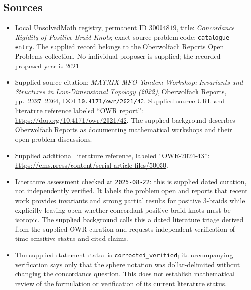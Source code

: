 \documentclass[11pt]{article}
\begin{document}
\subsection{Sources}
\begin{itemize}
\item Local UnsolvedMath registry, permanent ID \(30004819\), title: \emph{Concordance Rigidity of Positive Braid Knots}; exact source problem code: \texttt{catalogue entry}. The supplied record belongs to the Oberwolfach Reports Open Problems collection. No individual proposer is supplied; the recorded proposed year is \(2021\).
\item Supplied source citation: \emph{MATRIX-MFO Tandem Workshop: Invariants and Structures in Low-Dimensional Topology (2022)}, Oberwolfach Reports, pp.\ 2327--2364, DOI \texttt{10.4171/owr/2021/42}. Supplied source URL and literature reference labeled ``OWR report'': \url{https://doi.org/10.4171/owr/2021/42}. The supplied background describes Oberwolfach Reports as documenting mathematical workshops and their open-problem discussions.
\item Supplied additional literature reference, labeled ``OWR-2024-43'': \url{https://ems.press/content/serial-article-files/50050}.
\item Literature assessment checked at \texttt{2026-08-22}: this is supplied dated curation, not independently verified. It labels the problem open and reports that recent work provides invariants and strong partial results for positive \(3\)-braids while explicitly leaving open whether concordant positive braid knots must be isotopic. The supplied background calls this a dated literature triage derived from the supplied OWR curation and requests independent verification of time-sensitive status and cited claims.
\item The supplied statement status is \texttt{corrected\_verified}; its accompanying verification says only that the sphere notation was dollar-delimited without changing the concordance question. This does not establish mathematical review of the formulation or verification of its current literature status.
\end{itemize}
\end{document}
